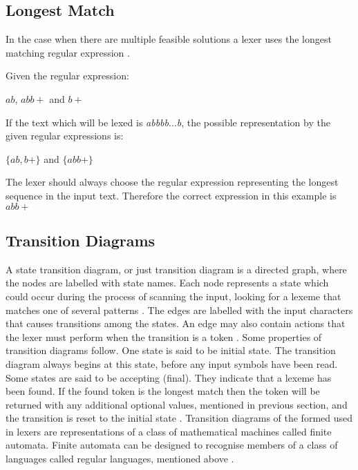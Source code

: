 \subsection{Longest Match}
In the case when there are multiple feasible solutions a lexer 
uses the longest matching regular expression \cite{Aho2006}.
\begin{example} $ $\\
Given the regular expression:
\begin{center} $ab$, $abb+$ and $b+$ \end{center}
If the text which will be lexed is \emph{abbbb$\ldots$b}, the possible
representation by the given regular expressions is:
\begin{center}$\{ab, b+\}$ and $\{abb+\}$\end{center}
The lexer should always choose the regular expression representing the longest
sequence in the input text. 
Therefore the correct expression in this example is $abb+$
\end{example}

\subsection{Transition Diagrams}
A state transition diagram, or just transition diagram is a directed graph,
where the nodes are labelled with state names. Each node 
represents a state which could occur during the process of scanning the input, 
looking for a lexeme that matches one of several patterns \cite{Aho2006}. The 
edges are labelled with the input characters that causes transitions among 
the states. An edge may also contain actions that the lexer must perform when the
transition is a token \cite{sebesta2012}. Some properties of transition diagrams
follow. One state is said to be initial state. The transition 
diagram always begins at this state, before any input symbols have been read. 
Some states are said to be accepting (final). They indicate that a lexeme has 
been found. If the found token is the longest match then the token will be 
returned with any additional optional values, mentioned in previous section, 
and the transition is reset to the initial state \cite{Aho2006}.
Transition diagrams of the formed used in lexers are representations of a class 
of mathematical machines called finite automata. Finite automata can be 
designed to recognise members of a class of languages called regular languages, 
mentioned above \cite{sebesta2012}.
